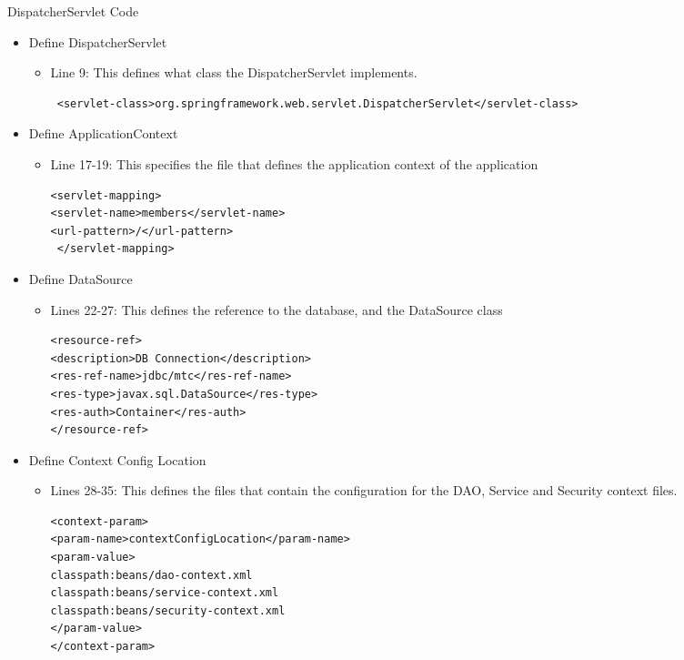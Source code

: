 \begin{table}[H]
\caption{DispatcherServlet Code}
\begin{itemize}
\item Define DispatcherServlet
\begin{itemize}
\item Line 9: This defines what class the DispatcherServlet implements.
\begin{lstlisting}
 <servlet-class>org.springframework.web.servlet.DispatcherServlet</servlet-class>
\end{lstlisting}
\end{itemize}
\item Define ApplicationContext
\begin{itemize}
\item Line 17-19: This specifies the file that defines the application context of the application
\begin{lstlisting}
<servlet-mapping>
<servlet-name>members</servlet-name>
<url-pattern>/</url-pattern>
 </servlet-mapping>
\end{lstlisting}
\end{itemize}
\item Define DataSource
\begin{itemize}
\item Lines 22-27: This defines the reference to the database, and the DataSource class
\begin{lstlisting}
<resource-ref>
<description>DB Connection</description>
<res-ref-name>jdbc/mtc</res-ref-name>
<res-type>javax.sql.DataSource</res-type>
<res-auth>Container</res-auth>
</resource-ref>
\end{lstlisting}
\end{itemize}
\item Define Context Config Location
\begin{itemize}
\item Lines 28-35: This defines the files that contain the configuration for the DAO, Service and Security context files.
\begin{lstlisting}
<context-param>
<param-name>contextConfigLocation</param-name>
<param-value>
classpath:beans/dao-context.xml
classpath:beans/service-context.xml
classpath:beans/security-context.xml
</param-value>
</context-param>
\end{lstlisting}
\end{itemize}
\end{itemize}
\label{fig:webxmlExplain}
\end{table}

